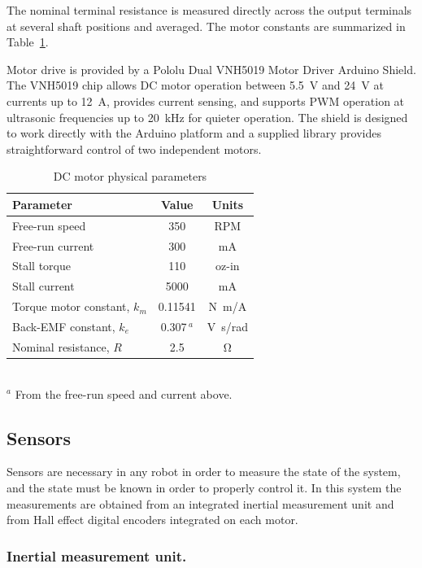 The nominal terminal resistance is measured directly across the output
terminals at several shaft positions and averaged. The motor constants are summarized in
Table~\ref{tab:motor}.

Motor drive is provided by a Pololu Dual VNH5019 Motor Driver Arduino Shield.
The VNH5019 chip allows DC motor operation between \SI{5.5}{V} and \SI{24}{V} at
currents up to \SI{12}{A}, provides current sensing, and supports PWM operation
at ultrasonic frequencies up to \SI{20}{kHz} for quieter operation. The shield
is designed to work directly with the Arduino platform and a supplied library
provides straightforward control of two independent motors.

\begin{table}[htbp]
\centering
\caption{DC motor physical parameters}
\label{tab:motor}
\begin{tabular}{lcc}
\toprule
Parameter & Value & Units \\
\midrule
Free-run speed & 350 & RPM \\
Free-run current & 300 & mA \\
Stall torque & 110 & oz-in \\
Stall current & 5000 & mA \\
Torque motor constant, $k_m$ & 0.11541 & \si{N.m/A} \\
Back-EMF constant, $k_e$ & 0.307\,$^a$ & \si{V.s/rad} \\
Nominal resistance, $R$ & 2.5 & \si{\ohm} \\
\bottomrule
\end{tabular}\\[2pt]
{\footnotesize $^a$ From the free-run speed and current above.}
\end{table}

\subsection{Sensors}

Sensors are necessary in any robot in order to measure the state of the system,
and the state must be known in order to properly control it. In this system the
measurements are obtained from an integrated inertial measurement unit and from
Hall effect digital encoders integrated on each motor.

\subsubsection{Inertial measurement unit.}

